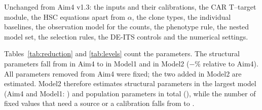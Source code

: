 \documentclass[11pt]{article}
\begin{document}
Unchanged from Aim4 v1.3: the inputs and their calibrations, the CAR T--target module, the HSC equations apart from $\alpha$, the clone types, the individual baselines, the observation model for the counts, the phenotype rule, the nested model set, the selection rules, the DE-ITS controls and the numerical settings.

Tables~\ref{tab:reduction} and \ref{tab:levels} count the parameters. The structural parameters fall from \valNStructAimFour{} in Aim4 to \valNStructModelOne{} in Model1 and \valNStruct{} in Model2 ($-$\valReductionPct\% relative to Aim4). All parameters removed from Aim4 were fixed; the two added in Model2 are estimated. Model2 therefore estimates \valNEst{} structural parameters in the largest model (Aim4 and Model1: \valNEstModelOne) and \valNPop{} population parameters in total (\valNPopModelOne), while the number of fixed values that need a source or a calibration falls from \valNFixedAimFour{} to \valNFixed.



\end{document}
